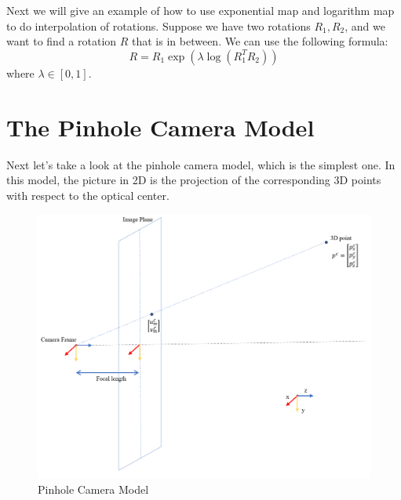 \documentclass[
]{book}
\theoremstyle{definition}
\theoremstyle{definition}
\theoremstyle{definition}
\theoremstyle{definition}
\theoremstyle{remark}
\begin{document}
Next we will give an example of how to use exponential map and logarithm map to do interpolation of rotations. Suppose we have two rotations \(R_1,R_2\), and we want to find a rotation \(R\) that is in between. We can use the following formula:
\[R = R_1\exp(\lambda\log(R_1^TR_2))\]
where \(\lambda\in[0,1]\).

\hypertarget{the-pinhole-camera-model}{%
\section{The Pinhole Camera Model}\label{the-pinhole-camera-model}}

Next let's take a look at the pinhole camera model, which is the simplest one. In this model, the picture in 2D is the projection of the corresponding 3D points with respect to the optical center.

\begin{figure}

{\centering \includegraphics[width=1\linewidth]{images/pinhole_camera} 

}

\caption{Pinhole Camera Model}\label{fig:pinhole-model}
\end{figure}
\end{document}
